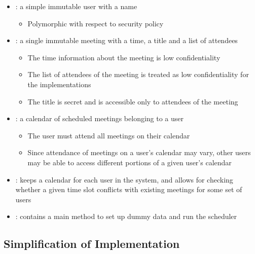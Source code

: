 \begin{itemize}
	
	\item {}: a simple immutable user with a name
	
	\begin{itemize}
		\item Polymorphic with respect to security policy
	\end{itemize}

	\item {}: a single immutable meeting with a time, a title and a list of attendees
	
	\begin{itemize}
		\item The time information about the meeting is low confidentiality
		
		\item The list of attendees of the meeting is treated as low confidentiality for the implementations
		
		\item The title is secret and is accessible only to attendees of the meeting
	\end{itemize}

	\item {}: a calendar of scheduled meetings belonging to a user

	\begin{itemize}
		\item The user must attend all meetings on their calendar
		
		\item Since attendance of meetings on a user's calendar may vary, other users may be able to access different portions of a given user's calendar
	\end{itemize}
	
	\item {}: keeps a calendar for each user in the system, and allows for checking whether a given time slot conflicts with existing meetings for some set of users
	
	\item {}: contains a main method to set up dummy data and run the scheduler
	
	
\end{itemize}

\subsection{Simplification of Implementation}

